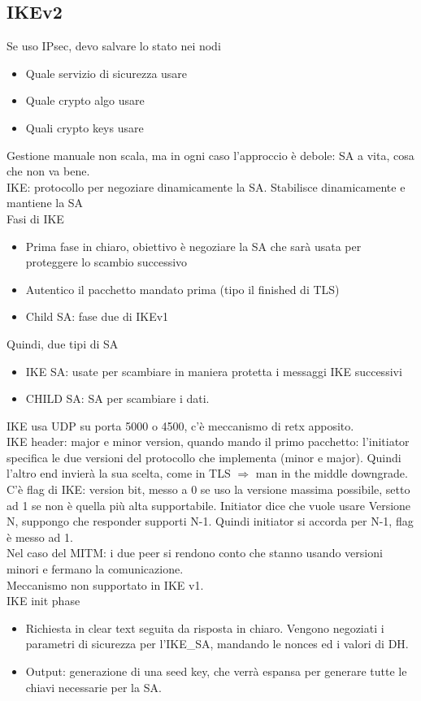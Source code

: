 \documentclass[16px]{article}
\begin{document}
\subsection{IKEv2}
Se uso IPsec, devo salvare lo stato nei nodi
\begin{itemize}
\item Quale servizio di sicurezza usare
\item Quale crypto algo usare
\item Quali crypto keys usare
\end{itemize}
Gestione manuale non scala, ma in ogni caso l'approccio è debole: SA a vita, cosa che non va bene.\\ IKE: protocollo per negoziare dinamicamente la SA. Stabilisce dinamicamente e mantiene la SA\\
Fasi di IKE
\begin{itemize}
\item Prima fase in chiaro, obiettivo è negoziare la SA che sarà usata per proteggere lo scambio successivo
\item Autentico il pacchetto mandato prima (tipo il finished di TLS)
\item Child SA: fase due di IKEv1
\end{itemize}
Quindi, due tipi di SA
\begin{itemize}
\item IKE SA: usate per scambiare in maniera protetta i messaggi IKE successivi
\item CHILD SA: SA per scambiare i dati.
\end{itemize}
IKE usa UDP su porta 5000 o 4500, c'è meccanismo di retx apposito.\\ IKE header: major e minor version, quando mando il primo pacchetto: l'initiator specifica le due versioni del protocollo che implementa (minor e major). Quindi l'altro end invierà la sua scelta, come in TLS $\Rightarrow$ man in the middle downgrade. C'è flag di IKE: version bit, messo a 0 se uso la versione massima possibile, setto ad 1 se non è quella più alta supportabile. Initiator dice che vuole usare Versione N, suppongo che responder supporti N-1. Quindi initiator si accorda per N-1, flag è messo ad 1.\\ Nel caso del MITM: i due peer si rendono conto che stanno usando versioni minori e fermano la comunicazione.\\ Meccanismo non supportato in IKE v1.\\ IKE init phase
\begin{itemize}
\item Richiesta in clear text seguita da risposta in chiaro. Vengono negoziati i parametri di sicurezza per l'IKE\_SA, mandando le nonces ed i valori di DH.
\item Output: generazione di una seed key, che verrà espansa per generare tutte le chiavi necessarie per la SA.
\end{itemize}
\end{document}
